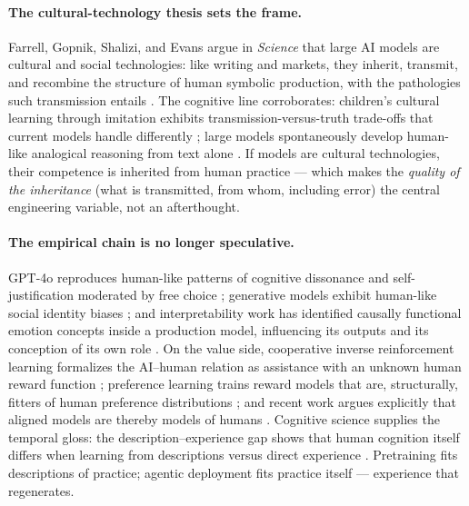 \documentclass[10pt]{article}
\begin{document}
\paragraph{The cultural-technology thesis sets the frame.}
Farrell, Gopnik, Shalizi, and Evans argue in \emph{Science} that large AI models are cultural and social technologies: like writing and markets, they inherit, transmit, and recombine the structure of human symbolic production, with the pathologies such transmission entails \cite{farrell2025cultural}. The cognitive line corroborates: children's cultural learning through imitation exhibits transmission-versus-truth trade-offs that current models handle differently \cite{yiu2024transmission}; large models spontaneously develop human-like analogical reasoning from text alone \cite{webb2023emergent}. If models are cultural technologies, their competence is inherited from human practice --- which makes the \emph{quality of the inheritance} (what is transmitted, from whom, including error) the central engineering variable, not an afterthought.

\paragraph{The empirical chain is no longer speculative.}
GPT-4o reproduces human-like patterns of cognitive dissonance and self-justification moderated by free choice \cite{lehr2025kernels}; generative models exhibit human-like social identity biases \cite{hu2025generative}; and interpretability work has identified causally functional emotion concepts inside a production model, influencing its outputs and its conception of its own role \cite{anthropic2026emotions}. On the value side, cooperative inverse reinforcement learning formalizes the AI--human relation as assistance with an unknown human reward function \cite{hadfield2016cooperative}; preference learning trains reward models that are, structurally, fitters of human preference distributions \cite{christiano2017deep, ouyang2022training}; and recent work argues explicitly that aligned models are thereby models of humans \cite{yuan2026aligned}. Cognitive science supplies the temporal gloss: the description--experience gap shows that human cognition itself differs when learning from descriptions versus direct experience \cite{hertwig2009description}. Pretraining fits descriptions of practice; agentic deployment fits practice itself --- experience that regenerates.
\end{document}
